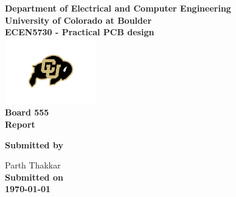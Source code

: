\begin{titlepage}
\center %

\textbf{\large Department of Electrical and Computer Engineering}\\[0.5cm]
\textbf{\Large University of Colorado at Boulder}\\[1cm]
\textbf{\large ECEN5730 - Practical PCB design}\\[2cm]
\includegraphics[width=0.3\textwidth]{figures/cu}\\[2cm] 

	
\textbf{\Huge Board 555 }\\[0.2cm]

\textbf{\Large Report}\\[5cm]




\vfill

\textbf{\large Submitted by}

{\large Parth Thakkar}\\[0.5cm]


\textbf{\large Submitted on}\\
\textbf{\Large \today} %


\vfill %

\end{titlepage}